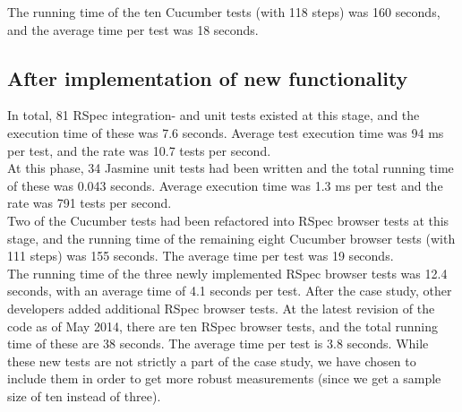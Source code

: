 The running time of the ten Cucumber tests (with 118 steps) was 160
seconds, and the average time per test was 18 seconds.\\


\subsection{After implementation of new functionality}

In total, 81 RSpec integration- and unit tests existed at this stage,
and the execution time of these was 7.6 seconds. Average test execution
time was 94 ms per test, and the rate was 10.7 tests per
second.\\

At this phase, 34 Jasmine unit tests had been written and the total
running time of these was 0.043 seconds. Average execution time was 1.3
ms per test and the rate was 791 tests per second.\\

Two of the Cucumber tests had been refactored into RSpec browser tests
at this stage, and the running time of the remaining eight Cucumber
browser tests (with 111 steps) was 155 seconds. The average time per
test was 19 seconds.\\

The running time of the three newly implemented RSpec browser tests was
12.4 seconds, with an average time of 4.1 seconds per test. After the
case study, other developers added additional RSpec browser tests.  At
the latest revision of the code as of May 2014, there are ten RSpec
browser tests, and the total running time of these are 38 seconds. The
average time per test is 3.8 seconds. While these new tests are not
strictly a part of the case study, we have chosen to include them in
order to get more robust measurements (since we get a sample size of ten
instead of three).\\

